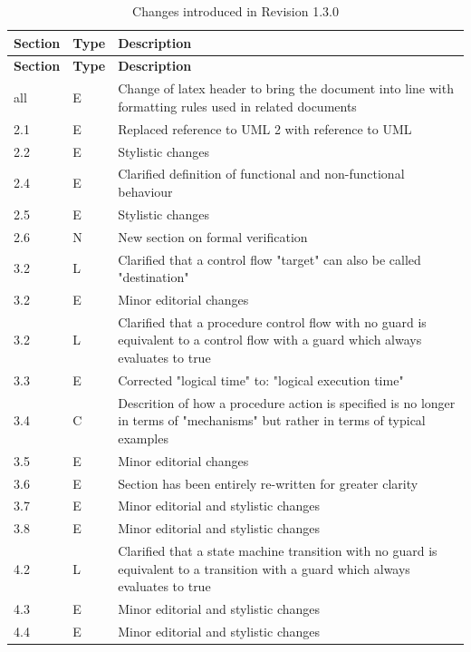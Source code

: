 \documentclass[definition]{../fwprofile}
\begin{document}
\begin{longtable}{|p{1.5cm}|p{1cm}|p{8cm}|}
\caption{Changes introduced in Revision 1.3.0}  \\
\hline
\rowcolor{light-gray}
\textbf{Section} & \textbf{Type} & \textbf{Description} \\
\hline\hline
\endfirsthead
\rowcolor{light-gray}
\textbf{Section} & \textbf{Type} & \textbf{Description} \\
\hline\hline
\endhead
all  & E & Change of latex header to bring the document into line with formatting rules used in related documents\\
\hline
2.1  & E & Replaced reference to UML 2 with reference to UML\\
\hline
2.2  & E & Stylistic changes\\
\hline
2.4  & E & Clarified definition of functional and non-functional behaviour\\
\hline
2.5  & E & Stylistic changes\\
\hline
2.6  & N & New section on formal verification\\
\hline
3.2  & L & Clarified that a control flow "target" can also be called "destination"\\
\hline
3.2  & E & Minor editorial changes \\
\hline
3.2  & L & Clarified that a procedure control flow with no guard is equivalent to a control flow with a guard which always evaluates to true\\
\hline
3.3  & E & Corrected "logical time" to: "logical execution time"\\
\hline
3.4  & C & Descrition of how a procedure action is specified is no longer in terms of "mechanisms" but rather in terms of typical examples\\
\hline
3.5  & E & Minor editorial changes \\
\hline
3.6  & E & Section has been entirely re-written for greater clarity\\
\hline
3.7  & E & Minor editorial and stylistic changes \\
\hline
3.8  & E & Minor editorial and stylistic changes \\
\hline
4.2  & L & Clarified that a state machine transition with no guard is equivalent to a transition with a guard which always evaluates to true\\
\hline
4.3  & E & Minor editorial and stylistic changes \\
\hline
4.4  & E & Minor editorial and stylistic changes \\

\end{longtable}
\end{document}
